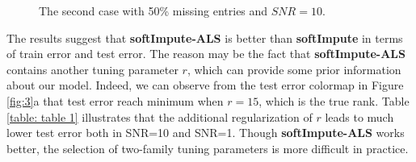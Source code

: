 \documentclass[11pt]{article}
\begin{document}
\begin{figure}[ht!]\centering                                                          
	\caption{The second case with 50\% missing entries and $SNR=10$. }
	\label{fig:4}	                                                    
\end{figure}

The results suggest that \textbf{softImpute-ALS} is better than \textbf{softImpute} in terms of train error and test error. The reason may be the fact that \textbf{softImpute-ALS} contains another tuning parameter $r$, which can provide some prior information about our model. Indeed, we can observe from the test error colormap in Figure \ref{fig:3}a that test error reach minimum when $r=15$, which is the true rank. Table \ref{table: table 1} illustrates that the additional regularization of $r$ leads to much lower test error both in SNR=10 and SNR=1. Though \textbf{softImpute-ALS} works better, the selection of two-family tuning parameters is more difficult in practice.
 
\end{document}
